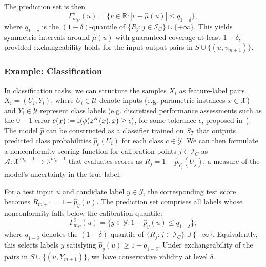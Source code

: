 The prediction set is then
\[
\Gamma^\delta_{m_C}(u) = \{ v \in \mathbb{R} : |v - \hat{\mu}(u)| \le q_{1-\delta} \},
\]
where $q_{1-\delta}$ is the $(1-\delta)$-quantile of $\{R_j : j \in \mathcal{I}_C\} \cup \{+\infty\}$. This yields symmetric intervals around $\hat{\mu}(u)$ with guaranteed coverage at least $1-\delta$, provided exchangeability holds for the input-output pairs in $S \cup \{(u, v_{m+1})\}$.

\subsubsection{Example: Classification}

In classification tasks, we can structure the samples $X_i$ as feature-label pairs $X_i = (U_i, Y_i)$, where $U_i \in \mathcal{U}$ denote inputs (e.g. parametric instances $x \in \mathcal{X}$) and $Y_i \in \mathcal{Y}$ represent class labels (e.g. discretised performance assessments such as the $0-1$ error $e(x) \vcentcolon= \mathbb{I}(\phi(z^K(x),x)  \geq \epsilon)$, for some tolerance $\epsilon$, proposed in~\cite{RSBS25}). The model $\hat{p}$ can be constructed as a classifier trained on $S_T$ that outputs predicted class probabilities $\hat{p}_c(U_i)$ for each class $c \in \mathcal{Y}$. We can then formulate a nonconformity scoring function for calibration points $j \in \mathcal{I}_C$ as  $\mathcal{A}: \mathcal{X}^{m_c +1} \to \mathbb{R}^{m_c +1}$ that evaluates scores as $R_j = 1 - \hat{p}_{Y_j}(U_j)$, a measure of the model's uncertainty in the true label.

For a test input $u$ and candidate label $y \in \mathcal{Y}$, the corresponding test score becomes $R_{m+1} = 1 - \hat{p}_y(u)$. The prediction set comprises all labels whose nonconformity falls below the calibration quantile:
\[
\Gamma^\delta_{m_C}(u) = \{ y \in \mathcal{Y} : 1 - \hat{p}_y(u) \le q_{1-\delta} \},
\]
where $q_{1-\delta}$ denotes the $(1-\delta)$-quantile of $\{R_j : j \in \mathcal{I}_C\} \cup \{+\infty\}$. Equivalently, this selects labels $y$ satisfying $\hat{p}_y(u) \ge 1 - q_{1-\delta}$. Under exchangeability of the pairs in $S \cup \{(u, Y_{m+1})\}$, we have conservative validity at level $\delta$.